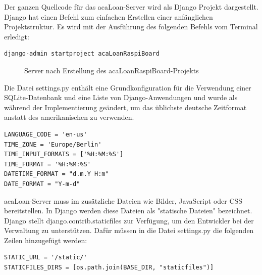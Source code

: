 Der ganzen Quellcode für das acaLoan-Server wird als Django Projekt dargestellt. Django hat einen Befehl zum einfachen Erstellen einer anfänglichen Projektstruktur. Es wird mit der Ausführung des folgenden Befehls vom Terminal erledigt:
\begin{lstlisting}[caption={[Erstellung acaLoan Django-Projekts] },captionpos=b]
 django-admin startproject acaLoanRaspiBoard   
\end{lstlisting}

\begin{figure}
	\centering
	\caption{Server nach Erstellung des acaLoanRaspiBoard-Projekts}
	\label{fig:django_start}
\end{figure}

Die Datei settings.py enthält eine Grundkonfiguration für die Verwendung einer SQLite-Datenbank und eine Liste von Django-Anwendungen und wurde als während der Implementierung geändert, um das üblichste deutsche Zeitformat anstatt des amerikanischen zu verwenden.
\begin{lstlisting}[caption={Deutsches Zeitformat in Django},captionpos=b]
LANGUAGE_CODE = 'en-us'
TIME_ZONE = 'Europe/Berlin'
TIME_INPUT_FORMATS = ['%H:%M:%S']
TIME_FORMAT = '%H:%M:%S'
DATETIME_FORMAT = "d.m.Y H:m"
DATE_FORMAT = "Y-m-d"
\end{lstlisting}
acaLoan-Server muss im zusätzliche Dateien wie Bilder, JavaScript oder CSS bereitstellen. In Django werden diese Dateien als "statische Dateien" bezeichnet. Django stellt django.contrib.staticfiles zur Verfügung, um den Entwickler bei der Verwaltung zu unterstützen. Dafür müssen in die Datei settings.py die folgenden Zeilen hinzugefügt werden:
\begin{lstlisting}[caption={[Die zusätzliche Dateien in das Projekt hinzufügen] },captionpos=b]
STATIC_URL = '/static/'
STATICFILES_DIRS = [os.path.join(BASE_DIR, "staticfiles")]
\end{lstlisting}

